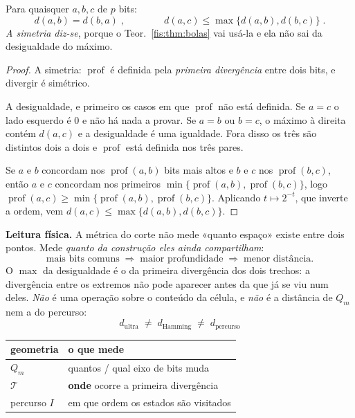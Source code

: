 \documentclass[livro.tex]{subfiles}
\begin{document}
\begin{lema}\label{fis:lem:ultra}
Para quaisquer $a,b,c$ de $p$ bits:
\[
d(a,b)=d(b,a)\;,\qquad\qquad d(a,c)\le\max\{d(a,b),d(b,c)\}\;.
\]
\emph{A simetria diz-se}, porque o Teor.~\ref{fis:thm:bolas} vai usá-la e ela não
sai da desigualdade do máximo.
\end{lema}

\begin{proof}
A simetria: $\operatorname{prof}$ é definida pela \emph{primeira divergência}
entre dois bits, e divergir é simétrico.

A desigualdade, e primeiro os casos em que $\operatorname{prof}$ não está
definida. Se $a=c$ o lado esquerdo é $0$ e não há nada a provar. Se $a=b$ ou
$b=c$, o máximo à direita contém $d(a,c)$ e a desigualdade é uma igualdade. Fora
disso os três são distintos dois a dois e $\operatorname{prof}$ está definida nos
três pares.

Se $a$ e $b$ concordam nos $\operatorname{prof}(a,b)$ bits mais altos e $b$ e $c$
nos $\operatorname{prof}(b,c)$, então $a$ e $c$ concordam nos primeiros
$\min\{\operatorname{prof}(a,b),\operatorname{prof}(b,c)\}$, logo
$\operatorname{prof}(a,c)\ge\min\{\operatorname{prof}(a,b),\operatorname{prof}(b,c)\}$.
Aplicando $t\mapsto2^{-t}$, que inverte a ordem, vem
$d(a,c)\le\max\{d(a,b),d(b,c)\}$.
\end{proof}

\medskip\noindent\textbf{Leitura física.} A métrica do corte não mede «quanto
espaço» existe entre dois pontos. Mede \emph{quanto da construção eles ainda
compartilham}:
\[
\boxed{\;
\text{mais bits comuns}
\;\Longrightarrow\;
\text{maior profundidade}
\;\Longrightarrow\;
\text{menor distância}.
\;}
\]
O $\max$ da desigualdade é o da primeira divergência dos dois trechos: a
divergência entre os extremos não pode aparecer antes da que já se viu num
deles. \emph{Não} é uma operação sobre o conteúdo da célula, e \emph{não} é a
distância de $Q_m$ nem a do percurso:
\[
\boxed{\;d_{\mathrm{ultra}}\;\neq\;d_{\mathrm{Hamming}}\;\neq\;d_{\mathrm{percurso}}\;}
\]
\begin{center}\footnotesize
\begin{tabular}{@{}ll@{}}
\toprule
geometria & o que mede \\
\midrule
$Q_m$ & quantos / qual eixo de bits muda \\
$\mathcal{T}$ & \textbf{onde} ocorre a primeira divergência \\
percurso $I$ & em que ordem os estados são visitados \\
\bottomrule
\end{tabular}
\end{center}
\end{document}
